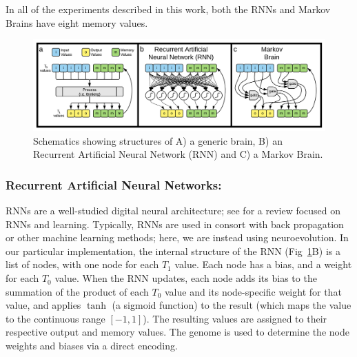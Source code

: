 In all of the experiments described in this work, both the RNNs and Markov Brains have eight memory values.

\begin{figure}
    \centering
    \includegraphics[width=\textwidth]{chapters/2-comp-hybrid/figs/ALIFE_2021_SI_Brains.pdf}
    \caption{Schematics showing structures of A) a generic brain, B) an Recurrent Artificial Neural Network (RNN) and C) a Markov Brain.}
    \label{fig:brains}
\end{figure}

\subsubsection {Recurrent Artificial Neural Networks:}
RNNs are a well-studied digital neural architecture; see \cite{yu_review_2019} for a review focused on RNNs and learning. 
Typically, RNNs are used in consort with back propagation or other machine learning methods; here, we are instead using neuroevolution. 
In our particular implementation, the internal structure of the RNN (Fig~\ref{fig:brains}B) is a  list of nodes, with one node for each  $T_1$ value. 
Each node has a bias, and a weight for each $T_0$ value. 
When the RNN updates, each node adds its bias to the summation of the product of each $T_0$ value and its node-specific weight for that value, and applies $\tanh$ (a sigmoid function) to the result (which maps the value to the continuous range $\left[ -1,1 \right]$). 
The resulting values are assigned to their respective output and memory values. 
The genome is used to determine the node weights and biases via a direct encoding.

